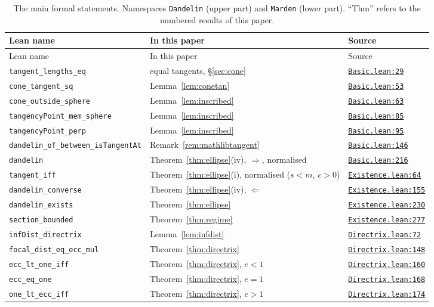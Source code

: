 \documentclass[11pt]{article}
\theoremstyle{remark}
\newcommand{\lean}[1]{\texttt{#1}}
\newcommand{\repoD}{https://github.com/jpbald93/dandelin}
\newcommand{\commitD}{205e4807a71d05898967d870e4528fb97d78b26d}
\newcommand{\srcD}[2]{\href{\repoD/blob/\commitD/Dandelin/#1\#L#2}{\texttt{#1:#2}}}
\begin{document}
\begin{longtable}{@{}p{}p{}l@{}}
\caption{The main formal statements. Namespaces \lean{Dandelin} (upper part) and \lean{Marden}
(lower part). ``Thm'' refers to the numbered results of this paper.}\label{tab:thms}\\
\toprule
Lean name & In this paper & Source \\ \midrule
\endfirsthead
\toprule
Lean name & In this paper & Source \\ \midrule
\endhead
\bottomrule
\endfoot
\lean{tangent\_lengths\_eq} & equal tangents, \S\ref{sec:cone} & \srcD{Basic.lean}{29} \\
\lean{cone\_tangent\_sq} & Lemma~\ref{lem:conetan} & \srcD{Basic.lean}{53} \\
\lean{cone\_outside\_sphere} & Lemma~\ref{lem:inscribed} & \srcD{Basic.lean}{63} \\
\lean{tangencyPoint\_mem\_sphere} & Lemma~\ref{lem:inscribed} & \srcD{Basic.lean}{85} \\
\lean{tangencyPoint\_perp} & Lemma~\ref{lem:inscribed} & \srcD{Basic.lean}{95} \\
\lean{dandelin\_of\_between\_isTangentAt} & Remark~\ref{rem:mathlibtangent} & \srcD{Basic.lean}{146} \\
\lean{dandelin} & Theorem~\ref{thm:ellipse}(iv), $\Rightarrow$, normalised & \srcD{Basic.lean}{216} \\
\lean{tangent\_iff} & Theorem~\ref{thm:ellipse}(i), normalised ($s<m$, $c>0$) & \srcD{Existence.lean}{64} \\
\lean{dandelin\_converse} & Theorem~\ref{thm:ellipse}(iv), $\Leftarrow$ & \srcD{Existence.lean}{155} \\
\lean{dandelin\_exists} & Theorem~\ref{thm:ellipse} & \srcD{Existence.lean}{230} \\
\lean{section\_bounded} & Theorem~\ref{thm:regime} & \srcD{Existence.lean}{277} \\
\lean{infDist\_directrix} & Lemma~\ref{lem:infdist} & \srcD{Directrix.lean}{72} \\
\lean{focal\_dist\_eq\_ecc\_mul} & Theorem~\ref{thm:directrix} & \srcD{Directrix.lean}{148} \\
\lean{ecc\_lt\_one\_iff} & Theorem~\ref{thm:directrix}, $e<1$ & \srcD{Directrix.lean}{160} \\
\lean{ecc\_eq\_one} & Theorem~\ref{thm:directrix}, $e=1$ & \srcD{Directrix.lean}{168} \\
\lean{one\_lt\_ecc\_iff} & Theorem~\ref{thm:directrix}, $e>1$ & \srcD{Directrix.lean}{174} \\

\end{longtable}
\end{document}

